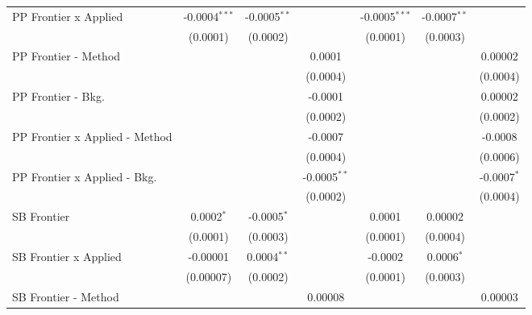 \begin{tabular}{lcccccc}
   PP Frontier x Applied          & -0.0004$^{***}$ & -0.0005$^{**}$  &                 & -0.0005$^{***}$ & -0.0007$^{**}$ &   \\   
                                  & (0.0001)        & (0.0002)        &                 & (0.0001)        & (0.0003)       &   \\   
   PP Frontier - Method           &                 &                 & 0.0001          &                 &                & 0.00002\\   
                                  &                 &                 & (0.0004)        &                 &                & (0.0004)\\   
   PP Frontier - Bkg.             &                 &                 & -0.0001         &                 &                & 0.00002\\   
                                  &                 &                 & (0.0002)        &                 &                & (0.0002)\\   
   PP Frontier x Applied - Method &                 &                 & -0.0007         &                 &                & -0.0008\\   
                                  &                 &                 & (0.0004)        &                 &                & (0.0006)\\   
   PP Frontier x Applied - Bkg.   &                 &                 & -0.0005$^{**}$  &                 &                & -0.0007$^{*}$\\   
                                  &                 &                 & (0.0002)        &                 &                & (0.0004)\\   
   SB Frontier                    & 0.0002$^{*}$    & -0.0005$^{*}$   &                 & 0.0001          & 0.00002        &   \\   
                                  & (0.0001)        & (0.0003)        &                 & (0.0001)        & (0.0004)       &   \\   
   SB Frontier x Applied          & -0.00001        & 0.0004$^{**}$   &                 & -0.0002         & 0.0006$^{*}$   &   \\   
                                  & (0.00007)       & (0.0002)        &                 & (0.0001)        & (0.0003)       &   \\   
   SB Frontier - Method           &                 &                 & 0.00008         &                 &                & 0.00003\\   

\end{tabular}
